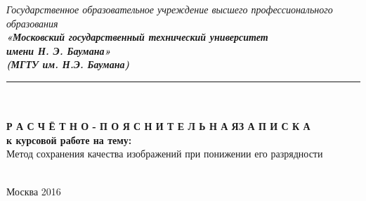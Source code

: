 


\begin{center}
	\hfill \break
	\textit{
		\normalsize{Государственное образовательное учреждение высшего профессионального образования}}\\ 
	
	\textit{
		\normalsize  {\bf  «Московский государственный технический университет}\\ 
		\normalsize  {\bf имени Н. Э. Баумана»}\\
		\normalsize  {\bf (МГТУ им. Н.Э. Баумана)}\\
	}
	\noindent\rule{\textwidth}{2pt}
	\hfill \break
	\noindent
	\\
	\noindent
	\\
	\hfill\break
	\hfill \break
	\hfill \break
	\hfill \break
	\normalsize{\bf Р А С Ч Ё Т Н О - П О Я С Н И Т Е Л Ь Н А Я\space\space З А П И С К А}\\
	\normalsize{\bf к курсовой работе на тему:}\\
	\hfill \break
	\large{Метод сохранения качества изображений при понижении его разрядности}\\
	\hfill \break
	\hfill \break
	\hfill \break
	\hfill \break
	\hfill \break	
	\normalsize {
		\noindent
	}\\
	\hfill \break	
	\normalsize {
		\noindent
	}
	\hfill \break
	\hfill \break
	\hfill \break
	\hfill \break
\end{center}
\hfill \break
\hfill \break
\begin{center} Москва 2016 \end{center}

